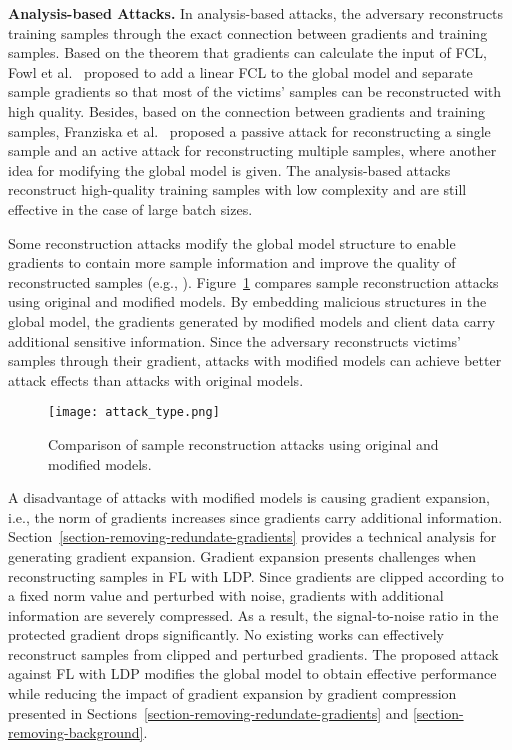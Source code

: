 \documentclass[lettersize,journal]{IEEEtran}
\begin{document}
\textbf{Analysis-based Attacks.} In analysis-based attacks, the adversary reconstructs training samples through the exact connection between gradients and training samples. Based on the theorem that gradients can calculate the input of FCL, Fowl et al.~\cite{fowl2022robbing} proposed to add a linear FCL to the global model and separate sample gradients so that most of the victims' samples can be reconstructed with high quality. Besides, based on the connection between gradients and training samples, Franziska et al.~\cite{Boenisch2021When} proposed a passive attack for reconstructing a single sample and an active attack for reconstructing multiple samples, where another idea for modifying the global model is given. The analysis-based attacks reconstruct high-quality training samples with low complexity and are still effective in the case of large batch sizes.

Some reconstruction attacks modify the global model structure to enable gradients to contain more sample information and improve the quality of reconstructed samples (e.g., \cite{fowl2022robbing, Boenisch2021When, Song2020Analyzing, Khosravy2022Model, ganev2023inadequacy}). Figure~\ref{fig:attack_type} compares sample reconstruction attacks using original and modified models. By embedding malicious structures in the global model, the gradients generated by modified models and client data carry additional sensitive information. Since the adversary reconstructs victims' samples through their gradient, attacks with modified models can achieve better attack effects than attacks with original models.

\begin{figure}
\centering
\texttt{[image: attack\_type.png]}
\caption{Comparison of sample reconstruction attacks using original and modified models.}
\label{fig:attack_type}
\end{figure}

A disadvantage of attacks with modified models is causing gradient expansion, i.e., the norm of gradients increases since gradients carry additional information. Section~\ref{section-removing-redundate-gradients} provides a technical analysis for generating gradient expansion. Gradient expansion presents challenges when reconstructing samples in FL with LDP. Since gradients are clipped according to a fixed norm value and perturbed with noise, gradients with additional information are severely compressed. As a result, the signal-to-noise ratio in the protected gradient drops significantly. No existing works can effectively reconstruct samples from clipped and perturbed gradients. The proposed attack against FL with LDP modifies the global model to obtain effective performance while reducing the impact of gradient expansion by gradient compression presented in Sections~\ref{section-removing-redundate-gradients} and \ref{section-removing-background}.
\end{document}
